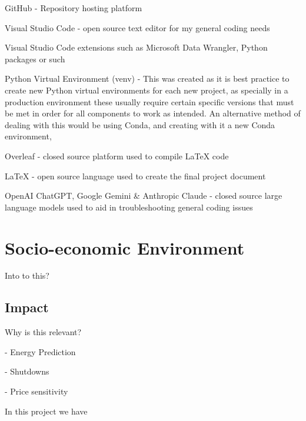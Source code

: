 \documentclass[12pt]{report} %
\begin{document}
GitHub - Repository hosting platform \cite{github}

Visual Studio Code - open source text editor for my general coding needs \cite{vscode}

Visual Studio Code extensions such as Microsoft Data Wrangler, Python packages or such

Python Virtual Environment (venv) - This was created as it is best practice to create new Python virtual environments for each new project, as specially in a production environment these usually require certain specific versions that must be met in order for all components to work as intended. An alternative method of dealing with this would be using Conda, and creating with it a new Conda environment, \cite{python_venv}

Overleaf - closed source platform used to compile LaTeX code \cite{overleaf}

LaTeX - open source language used to create the final project document \cite{latex}

OpenAI ChatGPT, Google Gemini \& Anthropic Claude - closed source large language models used to aid in troubleshooting general coding issues



\chapter{Socio-economic Environment}
Into to this?


\section{Impact}

Why is this relevant?

- Energy Prediction

- Shutdowns

- Price sensitivity

In this project we have

\end{document}
